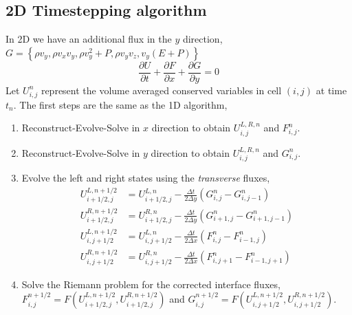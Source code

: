 \documentclass{article}
\newcommand{\ppderiv}[2]{\frac{\partial #1}{\partial #2}}
\begin{document}
\subsection{2D Timestepping algorithm } 
In 2D we have an additional flux in the $y$ direction, $G= \left\{ \rho v_y, \rho v_x v_y, \rho v_y^2 + P, \rho v_y v_z, v_y (E + P) \right\}$
\begin{equation}
	\ppderiv{U}{t} +\ppderiv{F}{x}  + \ppderiv{G}{y} = 0
\end{equation}
Let $U_{i,j}^n$ represent the volume averaged conserved variables in cell $(i,j)$ at time $t_n$.
The first steps are the same as the 1D algorithm, 
\begin{enumerate}
	\item Reconstruct-Evolve-Solve in $x$ direction to obtain $U_{i,j}^{L,R,n}$ and $F_{i,j}^n$.
	\item Reconstruct-Evolve-Solve in $y$ direction to obtain $U_{i,j}^{L,R,n}$ and $G_{i,j}^n$.  
	\item Evolve the left and right states using the \emph{transverse} fluxes, 
	\begin{align}
		U_{i+1/2,j}^{L,n+1/2} &= U_{i+1/2,j}^{L,n} - \frac{\Delta t}{2 \Delta y} \left( G_{i,j}^n - G_{i,j-1}^n \right) \\
		U_{i+1/2,j}^{R,n+1/2} &= U_{i+1/2,j}^{R,n} - \frac{\Delta t}{2 \Delta y} \left( G_{i+1,j}^n - G_{i+1,j-1}^n \right) \\
		U_{i,j+1/2}^{L,n+1/2} &= U_{i,j+1/2}^{L,n} - \frac{\Delta t}{2 \Delta x} \left( F_{i,j}^n - F_{i-1,j}^n \right) \\
		U_{i,j+1/2}^{R,n+1/2} &= U_{i,j+1/2}^{R,n} - \frac{\Delta t}{2 \Delta x} \left( F_{i,j+1}^n - F_{i-1,j+1}^n \right)
	\end{align}
	\item Solve the Riemann problem for the corrected interface fluxes, $F_{i,j}^{n+1/2} = F(U_{i+1/2,j}^{L,n+1/2}, U_{i+1/2,j}^{R,n+1/2})$ and $G_{i,j}^{n+1/2} = F(U_{i,j+1/2}^{L,n+1/2},U_{i,j+1/2}^{R,n+1/2})$. 


\end{enumerate}
\end{document}
